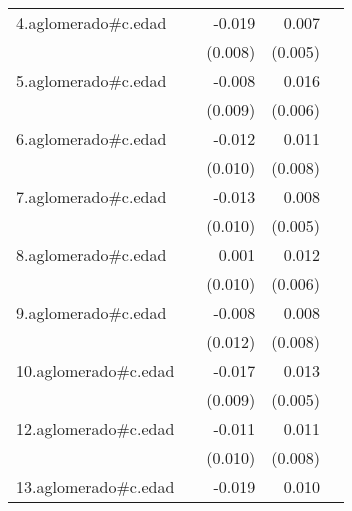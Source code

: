 {\begin{longtable}{l*{4}{D{.}{.}{-1}}}
\addlinespace
4.aglomerado#c.edad&                     &      -0.019\sym{*}  &       0.007         &                     \\
            &                     &     (0.008)         &     (0.005)         &                     \\
\addlinespace
5.aglomerado#c.edad&                     &      -0.008         &       0.016\sym{**} &                     \\
            &                     &     (0.009)         &     (0.006)         &                     \\
\addlinespace
6.aglomerado#c.edad&                     &      -0.012         &       0.011         &                     \\
            &                     &     (0.010)         &     (0.008)         &                     \\
\addlinespace
7.aglomerado#c.edad&                     &      -0.013         &       0.008         &                     \\
            &                     &     (0.010)         &     (0.005)         &                     \\
\addlinespace
8.aglomerado#c.edad&                     &       0.001         &       0.012\sym{*}  &                     \\
            &                     &     (0.010)         &     (0.006)         &                     \\
\addlinespace
9.aglomerado#c.edad&                     &      -0.008         &       0.008         &                     \\
            &                     &     (0.012)         &     (0.008)         &                     \\
\addlinespace
10.aglomerado#c.edad&                     &      -0.017         &       0.013\sym{*}  &                     \\
            &                     &     (0.009)         &     (0.005)         &                     \\
\addlinespace
12.aglomerado#c.edad&                     &      -0.011         &       0.011         &                     \\
            &                     &     (0.010)         &     (0.008)         &                     \\
\addlinespace
13.aglomerado#c.edad&                     &      -0.019\sym{*}  &       0.010\sym{*}  &                     \\

\end{longtable}}
